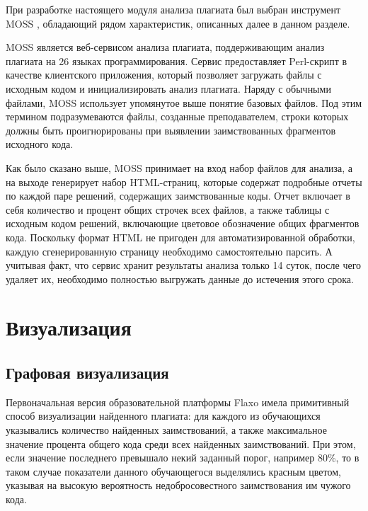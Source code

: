 \documentclass[a4paper,14pt]{extarticle}
\begin{document}
При разработке настоящего модуля анализа плагиата был выбран инструмент MOSS \citep{mossOriginalPaper}, обладающий рядом характеристик, описанных далее в данном разделе.

MOSS является веб-сервисом анализа плагиата, поддерживающим анализ плагиата на 26 языках программирования. Сервис предоставляет Perl-скрипт в качестве клиентского приложения, который позволяет загружать файлы с исходным кодом и инициализировать анализ плагиата. Наряду с обычными файлами, MOSS использует упомянутое выше понятие базовых файлов. Под этим термином подразумеваются файлы, созданные преподавателем, строки которых должны быть проигнорированы при выявлении заимствованных фрагментов исходного кода.

Как было сказано выше, MOSS принимает на вход набор файлов для анализа, а на выходе генерирует набор HTML-страниц, которые содержат подробные отчеты по каждой паре решений, содержащих заимствованные коды. Отчет включает в себя количество и процент общих строчек всех файлов, а также таблицы с исходным кодом решений, включающие цветовое обозначение общих фрагментов кода. Поскольку формат HTML не пригоден для автоматизированной обработки, каждую сгенерированную страницу необходимо самостоятельно парсить. А учитывая факт, что сервис хранит результаты анализа только 14 суток, после чего удаляет их, необходимо полностью выгружать данные до истечения этого срока.

\section{Визуализация}

\subsection{Графовая визуализация}

Первоначальная версия образовательной платформы Flaxo имела примитивный способ визуализации найденного плагиата: для каждого из обучающихся указывались количество найденных заимствований, а также максимальное значение процента общего кода среди всех найденных заимствований. При этом, если значение последнего превышало некий заданный порог, например 80\%, то в таком случае показатели данного обучающегося выделялись красным цветом, указывая на высокую вероятность недобросовестного заимствования им чужого кода.
\end{document}
